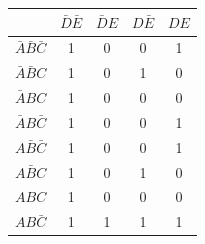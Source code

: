     
    \begin{table}[H]
        \begin{center}
            \def\arraystretch{1.5}
            \begin{tabular}{|c|c|c|c|c|}
                \hline
                &	$\bar{D}\bar{E}$ &	$\bar{D}E$ &	$D\bar{E}$ & $DE$ \\
                \hline
                $\bar{A}\bar{B}\bar{C}$ & 1 & 0 & 0 & 1 \\
                \hline          
                $\bar{A}\bar{B}C$ & 1 & 0 & 1 & 0 \\
                \hline   
                $\bar{A}BC$ & 1 & 0 & 0 & 0 \\
                \hline     
                $\bar{A}B\bar{C}$  & 1 & 0 & 0 & 1 \\
                \hline
                
                $A\bar{B}\bar{C}$ & 1 & 0 & 0 & 1 \\
                
                \hline
                
                $A\bar{B}C$ & 1 & 0 & 1 & 0 \\
                \hline
                
                $ABC$ & 1 & 0 & 0 & 0 \\
                \hline
                
                $AB\bar{C}$ & 1 & 1 & 1 & 1 \\
                \hline
                
            \end{tabular}
        \end{center}

    \end{table}



